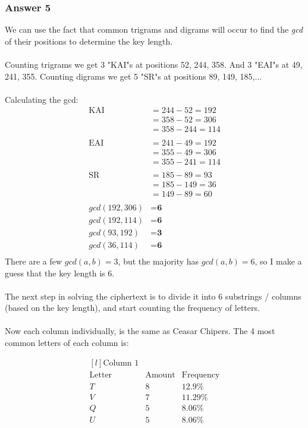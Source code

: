 \documentclass{article}
\begin{document}
	\subsubsection*{Answer 5}
	We can use the fact that common trigrams and digrams will occur to find the \textit{gcd} of their positions to determine the key length.
	\\\\	
	Counting trigrams we get 3 "KAI"s at positions 52, 244, 358. And 3 "EAI"s at 49, 241, 355. Counting digrams we get 5 "SR"s at positions 89, 149, 185,...
	\\\\
	Calculating the gcd:
	\[
	\begin{split}
	\text{KAI } &= 244-52=192 \\
	&=358-52=306 \\
	&=358-244=114\\
	\\
	\text{EAI }&= 241-49=192\\
	&=355-49=306\\
	&=355-241=114\\
	\\
	\text{SR }&=185-89=93\\
	&=185-149=36\\
	&=149-89=60\\
	\\
	gcd(192,306)&=\textbf{6}\\
	gcd(192,114)&=\textbf{6}\\
	gcd(93,192)&=\textbf{3}\\
	gcd(36,114)&=\textbf{6}\\
	\end{split}
	\]
	There are a few $gcd(a,b)=3$, but the majority has $gcd(a,b)=6$, so I make a guess that the key length is 6.
	\\\\
	The next step in solving the ciphertext is to divide it into 6 substrings / columns (based on the key length), and start counting the frequency of letters. 
	\\\\
	Now each column individually, is the same as Ceasar Chipers. The 4 most common letters of each column is:
	
	\[
	\begin{matrix*}[l]
	\text{Column 1} \\
	\text{Letter} & \text{Amount} & \text{Frequency} \\
	T & 8&12.9\% \\
	V & 7&11.29\% \\
	Q & 5&8.06\% \\
	U & 5&8.06\% 
	\end{matrix*}
	\]
	
\end{document}
